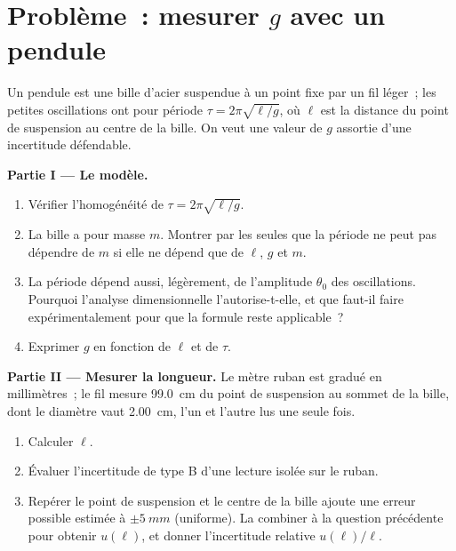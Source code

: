 \section{Problème~: mesurer $g$ avec un pendule}

\begin{problem}
\label{pb:b1:units-dimensions:1}
Un pendule est une bille d'acier suspendue à un point fixe par un fil
léger~; les petites oscillations ont pour période
$\tau = 2\pi\sqrt{\ell/g}$, où $\ell$ est la distance du point de
suspension au centre de la bille. On veut une valeur de $g$ assortie
d'une incertitude défendable.

\medskip
\noindent\textbf{Partie I --- Le modèle.}
\begin{enumerate}
  \item Vérifier l'homogénéité de $\tau = 2\pi\sqrt{\ell/g}$.
  \item La bille a pour masse $m$. Montrer par les seules  que
        la période ne peut pas dépendre de $m$ si elle ne dépend que de
        $\ell$, $g$ et $m$.
  \item La période dépend aussi, légèrement, de l'amplitude $\theta_0$
        des oscillations. Pourquoi l'analyse dimensionnelle
        l'autorise-t-elle, et que faut-il faire expérimentalement pour
        que la formule reste applicable~?
  \item Exprimer $g$ en fonction de $\ell$ et de $\tau$.
\end{enumerate}

\medskip
\noindent\textbf{Partie II --- Mesurer la longueur.}
Le mètre ruban est gradué en millimètres~; le fil mesure \qty{99.0}{cm}
du point de suspension au sommet de la bille, dont le diamètre vaut
\qty{2.00}{cm}, l'un et l'autre lus une seule fois.
\begin{enumerate}[resume]
  \item Calculer $\ell$.
  \item Évaluer l'incertitude de type B d'une lecture isolée sur le
        ruban.
  \item Repérer le point de suspension et le centre de la bille ajoute
        une erreur possible estimée à $\pm\qty{5}{mm}$ (uniforme). La
        combiner à la question précédente pour obtenir $u(\ell)$, et
        donner l'incertitude relative $u(\ell)/\ell$.
\end{enumerate}


\end{problem}
